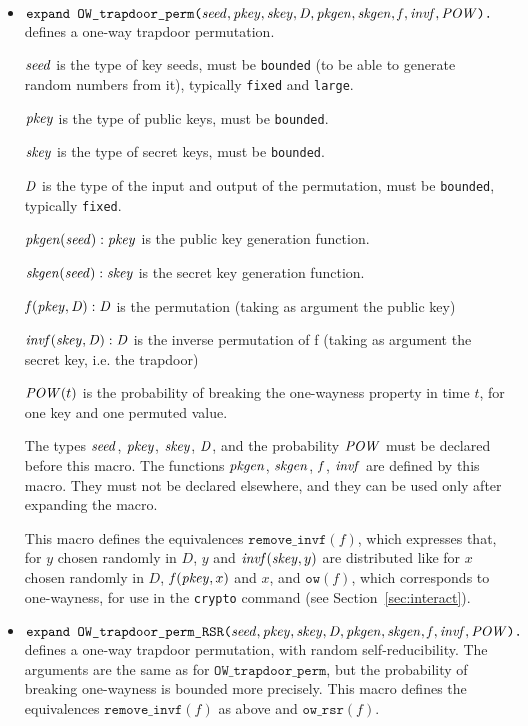 \documentclass{article}
\begin{document}
\begin{itemize}
\item $\texttt{expand OW\_trapdoor\_perm(}\mathit{seed}, \mathit{pkey}, \mathit{skey}, \mathit{D}, \mathit{pkgen}, \mathit{skgen}, \mathit{f}, \mathit{invf}, \mathit{POW}\texttt{).}$ defines a one-way trapdoor permutation.

   $\mathit{seed}$ is the type of key seeds, must be \texttt{bounded} (to be able to generate random numbers from it), typically \texttt{fixed} and \texttt{large}.

   $\mathit{pkey}$ is the type of public keys, must be \texttt{bounded}.

   $\mathit{skey}$ is the type of secret keys, must be \texttt{bounded}.

   $\mathit{D}$ is the type of the input and output of the permutation, must be \texttt{bounded}, typically \texttt{fixed}.

   $\mathit{pkgen}(\mathit{seed}): \mathit{pkey}$ is the public key generation function.

   $\mathit{skgen}(\mathit{seed}): \mathit{skey}$ is the secret key generation function.

   $\mathit{f}(\mathit{pkey}, \mathit{D}):\mathit{D}$ is the permutation (taking as argument the public key)

   $\mathit{invf}(\mathit{skey}, \mathit{D}):\mathit{D}$ is the inverse permutation of f (taking as argument the secret key,
         i.e. the trapdoor)

   $\mathit{POW}(t)$ is the probability of breaking the one-wayness property
   in time $t$, for one key and one permuted value.

   The types $\mathit{seed}$, $\mathit{pkey}$, $\mathit{skey}$, $\mathit{D}$, and the probability $\mathit{POW}$ must be
   declared before this macro. The functions $\mathit{pkgen}$, $\mathit{skgen}$, $\mathit{f}$, $\mathit{invf}$
   are defined by this macro. They must not be declared elsewhere, and
   they can be used only after expanding the macro. 

   This macro defines the equivalences $\texttt{remove\_invf}(f)$,
   which expresses that, for $y$ chosen randomly in $D$, $y$ and
   $\mathit{invf}(\mathit{skey}, y)$ are distributed like for $x$ chosen
   randomly in $D$, $\mathit{f}(\mathit{pkey}, x)$ and $x$, and
   $\texttt{ow}(f)$, which corresponds to one-wayness, for use in the
   \texttt{crypto} command (see Section~\ref{sec:interact}).

\item $\texttt{expand OW\_trapdoor\_perm\_RSR(}\mathit{seed}, \mathit{pkey}, \mathit{skey}, \mathit{D}, \mathit{pkgen}, \mathit{skgen}, \mathit{f}, \mathit{invf}, \mathit{POW}\texttt{).}$ defines a one-way trapdoor permutation, with random self-reducibility. The arguments are the same as for $\texttt{OW\_trapdoor\_perm}$, but the probability of breaking one-wayness is bounded more precisely. This macro defines the equivalences $\texttt{remove\_invf}(f)$ as above and $\texttt{ow\_rsr}(f)$.


\end{itemize}
\end{document}
